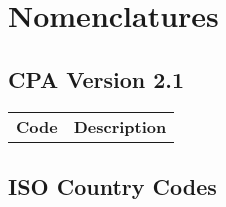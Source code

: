 \chapter{Nomenclatures}

\listoftables
\listoffigures

\section{CPA Version 2.1}

\begin{tabular}{l|c}%
    \bfseries Code & \bfseries Description%
\end{tabular}
\pagebreak
\section{ISO Country Codes}

%     


